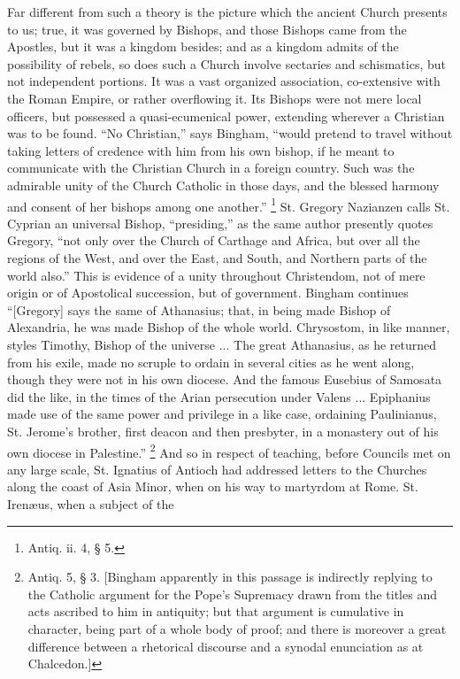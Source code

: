 Far different from such a theory is the picture which
the ancient Church presents to us; true, it was governed
by Bishops, and those Bishops came from the Apostles, but
it was a kingdom besides; and as a kingdom admits of the
possibility of rebels, so does such a Church involve
sectaries and schismatics, but not independent portions.
It was a vast organized association, co-extensive with
the Roman Empire, or rather overflowing it. Its Bishops
were not mere local officers, but possessed a
quasi-ecumenical power, extending wherever a Christian
was to be found. ``No Christian,'' says Bingham,
``would pretend to travel without taking letters of
credence with him from his own bishop, if he meant to
communicate with the Christian Church in a foreign
country. Such was the admirable unity of the Church
Catholic in those days, and the blessed harmony and
consent of her bishops among one another.'' \footnote{Antiq. ii. 4, § 5.} St.
Gregory Nazianzen calls St. Cyprian an universal Bishop,
``presiding,'' as the same author presently
quotes Gregory, ``not only over the Church of
Carthage and Africa, but over all the regions of the
West, and over the East, and South, and Northern parts of
the world also.'' This is evidence of a unity
throughout Christendom, not of mere origin or of
Apostolical succession, but of government. Bingham
continues ``[Gregory] says the same of Athanasius;
that, in being made Bishop of Alexandria, he was made
Bishop of the whole world. Chrysostom, in like manner,
styles Timothy, Bishop of the universe ... The great
Athanasius, as he returned from his exile, made no
scruple to ordain in several cities as he went along,
though they were not in his own diocese. And the famous
Eusebius of Samosata did the like, in the times of the
Arian persecution under Valens ... Epiphanius made use of
the same power and privilege in a like case, ordaining
Paulinianus, St. Jerome's brother, first deacon and then
presbyter, in a monastery out of his own diocese in
Palestine.'' \footnote{Antiq. 5, § 3. [Bingham
apparently in this passage is indirectly replying to the
Catholic argument for the Pope's Supremacy drawn from the
titles and acts ascribed to him in antiquity; but that
argument is cumulative in character, being part of a
whole body of proof; and there is moreover a great
difference between a rhetorical discourse and a synodal
enunciation as at Chalcedon.]} And so in respect of
teaching, before Councils met on any large scale, St.
Ignatius of Antioch had addressed letters to the Churches
along the coast of Asia Minor, when on his way to
martyrdom at Rome. St. Irenæus, when a subject of the
